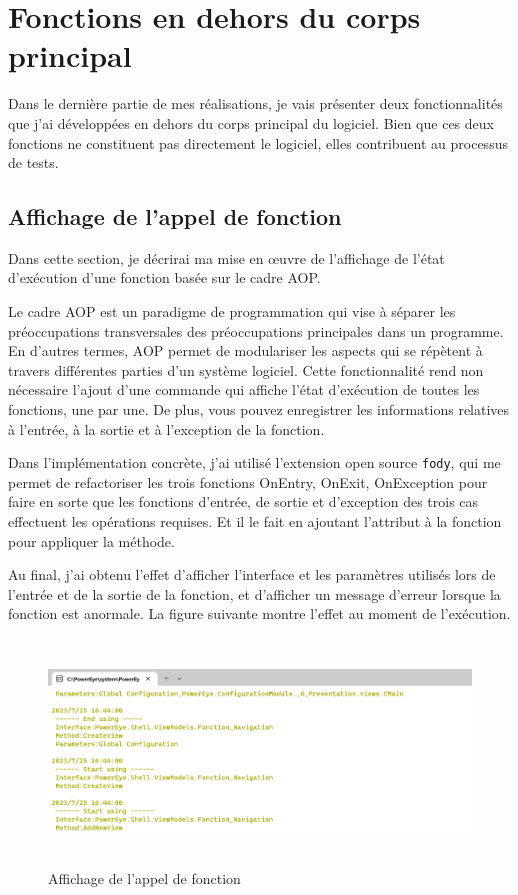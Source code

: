 \section{Fonctions en dehors du corps principal}
Dans le dernière partie de mes réalisations, je vais présenter deux fonctionnalités que j'ai développées en dehors du corps principal du logiciel. Bien que ces deux fonctions ne constituent pas directement le logiciel, elles contribuent au processus de tests.
\subsection{Affichage de l'appel de fonction}
Dans cette section, je décrirai ma mise en œuvre de l'affichage de l'état d'exécution d'une fonction basée sur le cadre AOP.

Le cadre AOP est un paradigme de programmation qui vise à séparer les préoccupations transversales des préoccupations principales dans un programme. En d'autres termes, AOP permet de modulariser les aspects qui se répètent à travers différentes parties d'un système logiciel. Cette fonctionnalité rend non nécessaire l'ajout d'une commande qui affiche l'état d'exécution de toutes les fonctions, une par une. De plus, vous pouvez enregistrer les informations relatives à l'entrée, à la sortie et à 
l'exception de la fonction. 

Dans l'implémentation concrète, j'ai utilisé l'extension open source \texttt{fody}, qui me permet de refactoriser les trois fonctions OnEntry, OnExit, OnException pour faire en sorte que les fonctions d'entrée, de sortie et d'exception des trois cas effectuent les opérations requises. Et il le fait en ajoutant l'attribut à la fonction pour appliquer la méthode. 

Au final, j'ai obtenu l'effet d'afficher l'interface et les paramètres utilisés lors de l'entrée et de la sortie de la fonction, et d'afficher un message d'erreur lorsque la fonction est anormale. La figure suivante montre l'effet au moment de l'exécution.

\begin{figure}[H]
    \centering
    \includegraphics[height=6cm]{ressources/images/aop_log.png}
    \caption{Affichage de l'appel de fonction}
\end{figure}

